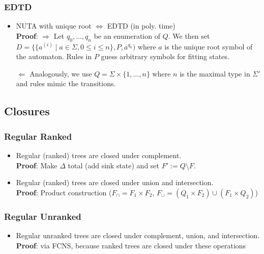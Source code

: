 \documentclass{article}
\begin{document}
\subsubsection{EDTD}
\begin{itemize}
	\item NUTA with unique root $\Leftrightarrow$ EDTD (in poly. time) \\
		\textbf{Proof}: $\boldsymbol{\Rightarrow}$ Let $q_0, \dots, q_n$ be an enumeration of $Q$. We then set $D = \{ \{ a^{(i)} \mid a \in \Sigma, 0 \leq i \leq n \}, P, a^{q_0})$ where $a$ is the unique root symbol of the automaton. Rules in $P$ guess arbitrary symbols for fitting states.
		
		$\boldsymbol{\Leftarrow}$ Analogously, we use $Q = \Sigma \times \{1, \dots, n\}$ where $n$ is the maximal type in $\Sigma'$ and rules mimic the transitions.
\end{itemize}

\subsection{Closures}
\subsubsection{Regular Ranked}
\begin{itemize}
	\item Regular (ranked) trees are closed under complement. \\
		\textbf{Proof}: Make $\Delta$ total (add sink state) and set $F' := Q \setminus F$.
	\item Regular (ranked) trees are closed under union and intersection. \\
		\textbf{Proof}: Product construction ($F_\cap = F_1 \times F_2$, $F_\cup = (Q_1 \times F_2) \cup (F_1 \times Q_2)$)
\end{itemize}

\subsubsection{Regular Unranked}
\begin{itemize}
	\item Regular unranked trees are closed under complement, union, and intersection. \\
		\textbf{Proof}: via FCNS, because ranked trees are closed under these operations
\end{itemize}
\end{document}
